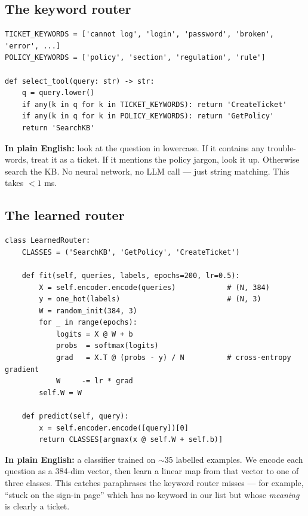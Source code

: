 \documentclass[11pt,a4paper]{article}
\begin{document}
\subsection{The keyword router}

\begin{lstlisting}
TICKET_KEYWORDS = ['cannot log', 'login', 'password', 'broken', 'error', ...]
POLICY_KEYWORDS = ['policy', 'section', 'regulation', 'rule']

def select_tool(query: str) -> str:
    q = query.lower()
    if any(k in q for k in TICKET_KEYWORDS): return 'CreateTicket'
    if any(k in q for k in POLICY_KEYWORDS): return 'GetPolicy'
    return 'SearchKB'
\end{lstlisting}

\textbf{In plain English:} look at the question in lowercase. If it contains any trouble-words, treat it as a ticket. If it mentions the policy jargon, look it up. Otherwise search the KB. No neural network, no LLM call --- just string matching. This takes $<1$ ms.

\subsection{The learned router}

\begin{lstlisting}
class LearnedRouter:
    CLASSES = ('SearchKB', 'GetPolicy', 'CreateTicket')

    def fit(self, queries, labels, epochs=200, lr=0.5):
        X = self.encoder.encode(queries)            # (N, 384)
        y = one_hot(labels)                         # (N, 3)
        W = random_init(384, 3)
        for _ in range(epochs):
            logits = X @ W + b
            probs  = softmax(logits)
            grad   = X.T @ (probs - y) / N          # cross-entropy gradient
            W     -= lr * grad
        self.W = W

    def predict(self, query):
        x = self.encoder.encode([query])[0]
        return CLASSES[argmax(x @ self.W + self.b)]
\end{lstlisting}

\textbf{In plain English:} a classifier trained on $\sim$35 labelled examples. We encode each question as a 384-dim vector, then learn a linear map from that vector to one of three classes. This catches paraphrases the keyword router misses --- for example, ``stuck on the sign-in page'' which has no keyword in our list but whose \emph{meaning} is clearly a ticket.
\end{document}
